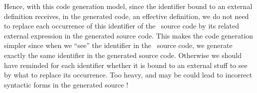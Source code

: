 Hence, with this code generation model, since the identifier bound to
an external definition receives, in the generated code, an effective
definition, we do not need to replace each occurrence of this
identifier of the \focalize\ source code by its related external
expression in the generated source code. This makes the code
generation simpler since when we ``see'' the identifier in the
\focalize\ source code, we generate exactly the same identifier in the
generated source code. Otherwise we should have reminded for each
identifier whether it is bound to an external stuff to see by what to
replace its occurrence. Too heavy, and may be could lead to incorrect
syntactic forms in the generated source !
